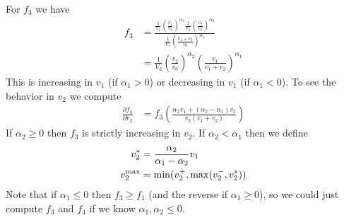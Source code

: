 \documentclass{article}
\begin{document}
For $f_3$ we have
\begin{align}
  f_3 &= \frac{\frac{1}{V_1} \left(\frac{v_1}{v_0}\right)^{\alpha_1}
      \frac{1}{V_2} \left(\frac{v_2}{v_0}\right)^{\alpha_2}}{
      \frac{1}{V_1} \left(\frac{v_1 + v_2}{v_0}\right)^{\alpha_1}} \\
    &= \frac{1}{V_2} \left(\frac{v_2}{v_0}\right)^{\alpha_2}
    \left(\frac{v_1}{v_1 + v_2}\right)^{\alpha_1}
\end{align}
This is increasing in $v_1$ (if $\alpha_1 > 0$) or decreasing in $v_1$
(if $\alpha_1 < 0$). To see the behavior in $v_2$ we compute
\begin{align}
  \frac{\partial f_3}{\partial v_2}
  &= f_3 \left(\frac{\alpha_2 v_1 + (\alpha_2 - \alpha_1) v_2}{
      v_2 (v_1 + v_2)}\right)
\end{align}
If $\alpha_2 \ge 0$ then $f_3$ is strictly increasing in $v_2$. If
$\alpha_2 < \alpha_1$ then we define
\begin{align}
  v_2^* &= \frac{\alpha_2}{\alpha_1 - \alpha_2} v_1 \\
  v_2^{\rm max} &= \min(v_2^+, \max(v_2^-, v_2^*))
\end{align}
Note that if $\alpha_1 \le 0$ then $f_3 \ge f_1$ (and the reverse if
$\alpha_1 \ge 0$), so we could just compute $f_3$ and $f_4$ if we know
$\alpha_1,\alpha_2 \le 0$.
\end{document}
